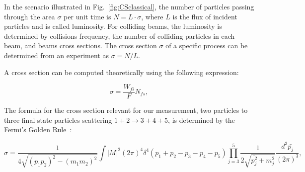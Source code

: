 In the scenario illustrated in Fig.~\ref{fig:CSclassical}, the number of particles passing through the area $\sigma$ per unit time is $N=L \cdot \sigma$, where $L$ is the flux of incident particles and is called luminosity. For colliding beams, the luminosity is determined by collisions frequency, the number of colliding particles in each beam, and beams cross sections. The cross section $\sigma$ of a specific process can be determined from an experiment as $\sigma=N/L$. 

A cross section can be computed theoretically using the following expression:

\begin{equation}
  \sigma = \frac{W_{fi}}{F} N_{fs},
\end{equation}

 
The formula for the cross section relevant for our measurement, two particles to three final state particles scattering $1+2\rightarrow 3+4+5$, is determined by the Fermi's Golden Rule~\cite{ref_Griffiths}: 

\begin{equation}\label{eq:FermiGoldenRule}
  \sigma = \frac{ 1 }{4\sqrt{(p_1p_2)^2-(m_1m_2)^2}} \int |M|^2 (2\pi)^4 \delta^4(p_1+p_2-p_3-p_4-p_5) \prod_{j=3}^{5} \frac{1}{2 \sqrt{\bar{p_j^2}+m_j^2 }}\frac{d^3\bar{p_j}}{(2\pi)^3},  
\end{equation}

 
